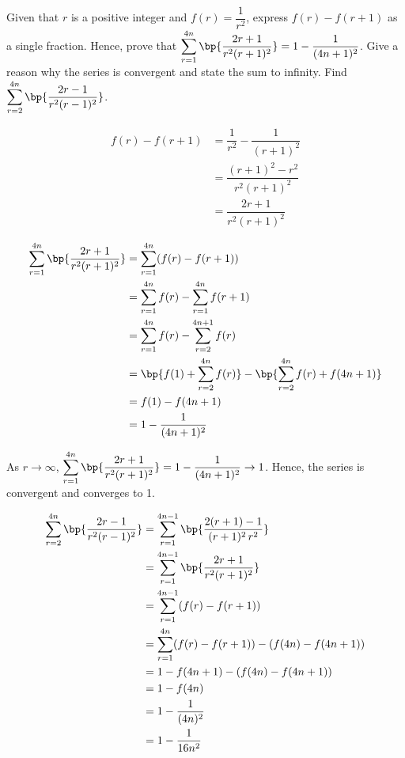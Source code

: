 \documentclass{echw}
\begin{document}
    \problem{}
        Given that $r$ is a positive integer and $f(r) = \dfrac1{r^2}$, express $f(r) - f(r+1)$ as a single fraction. Hence, prove that $\displaystyle\sum\limits_{r=1}^{4n} \bp{\dfrac{2r+1}{r^2(r+1)^2}} = 1 - \dfrac1{(4n+1)^2}$. Give a reason why the series is convergent and state the sum to infinity. Find $\displaystyle\sum\limits_{r=2}^{4n} \bp{\dfrac{2r-1}{r^2(r-1)^2}}$.

    \solution
        \begin{align*}
            f(r) - f(r+1) &= \dfrac1{r^2} - \dfrac1{(r+1)^2}\\
            &= \dfrac{(r+1)^2 - r^2}{r^2(r+1)^2}\\
            &= \dfrac{2r+1}{r^2(r+1)^2}
        \end{align*}


        \begin{align*}
            \sum\limits_{r=1}^{4n} \bp{\dfrac{2r+1}{r^2(r+1)^2}} &= \sum\limits_{r=1}^{4n} (f(r) - f(r+1))\\
            &= \sum\limits_{r=1}^{4n} f(r) - \sum\limits_{r=1}^{4n} f(r+1)\\
            &= \sum\limits_{r=1}^{4n} f(r) - \sum\limits_{r=2}^{4n+1} f(r)\\
            &= \bp{f(1) + \sum\limits_{r=2}^{4n} f(r)} - \bp{\sum\limits_{r=2}^{4n} f(r) + f(4n+1)}\\
            &= f(1) - f(4n+1)\\
            &= 1 - \dfrac{1}{(4n+1)^2}
        \end{align*}

        As $r \to \infty$, $\displaystyle\sum\limits_{r=1}^{4n} \bp{\dfrac{2r+1}{r^2(r+1)^2}} = 1 - \dfrac{1}{(4n+1)^2} \to 1$. Hence, the series is convergent and converges to 1.


        \begin{align*}
            \sum\limits_{r=2}^{4n} \bp{\dfrac{2r-1}{r^2(r-1)^2}} &= \sum\limits_{r=1}^{4n-1} \bp{\dfrac{2(r+1)-1}{(r+1)^2 \, r^2}}\\
            &= \sum\limits_{r=1}^{4n-1} \bp{\dfrac{2r+1}{r^2(r+1)^2}}\\
            &= \sum\limits_{r=1}^{4n-1} (f(r) - f(r+1))\\
            &= \sum\limits_{r=1}^{4n} (f(r) - f(r+1)) - (f(4n) - f(4n+1))\\
            &= 1 - f(4n+1) - (f(4n) - f(4n+1))\\
            &= 1 - f(4n)\\
            &= 1 - \dfrac1{(4n)^2}\\
            &= 1 - \dfrac1{16n^2}
        \end{align*}
\end{document}
